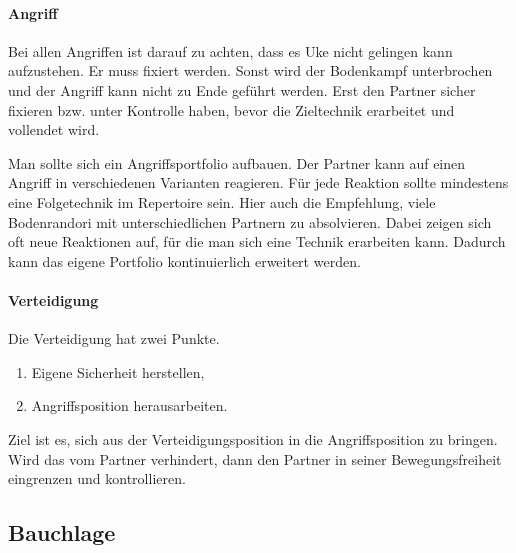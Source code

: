 \documentclass[justified, a4paper, notitlepage, captions=tableheading, nobib]{tufte-handout}
\begin{document}
\paragraph{Angriff}
\label{sec:org116e29a}
Bei allen Angriffen ist darauf zu achten, dass es Uke nicht gelingen kann aufzustehen. 
Er muss fixiert werden. Sonst wird der Bodenkampf unterbrochen und der Angriff kann nicht zu Ende geführt werden.
Erst den Partner sicher fixieren bzw. unter Kontrolle haben, bevor die Zieltechnik erarbeitet und vollendet wird.

Man sollte sich ein Angriffsportfolio aufbauen. Der Partner kann auf einen Angriff in verschiedenen Varianten reagieren. Für jede Reaktion sollte mindestens eine Folgetechnik im Repertoire sein. Hier auch die Empfehlung, viele Bodenrandori mit unterschiedlichen Partnern zu absolvieren. Dabei zeigen sich oft neue Reaktionen auf, für die man sich eine Technik erarbeiten kann. Dadurch kann das eigene Portfolio kontinuierlich erweitert werden. 

\paragraph{Verteidigung}
\label{sec:orgd85f621}
Die Verteidigung hat zwei Punkte. 
\begin{enumerate}
\item Eigene Sicherheit herstellen,
\item Angriffsposition herausarbeiten.
\end{enumerate}
Ziel ist es, sich aus der Verteidigungsposition in die Angriffsposition zu bringen. 
Wird das vom Partner verhindert, dann den Partner in seiner Bewegungsfreiheit eingrenzen und kontrollieren.

\subsection{\label{orgfae504a}Bauchlage }
\label{sec:org0f7f95c}
\end{document}
